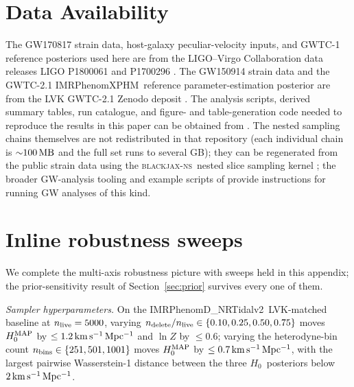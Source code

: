 \documentclass[usenatbib]{mnras}
\newcommand{\kmsmpc}{\ensuremath{\,\rm km\,s^{-1}\,Mpc^{-1}}\xspace}
\newcommand{\hzero}{\ensuremath{H_{0}}\xspace}
\newcommand{\IMR}{IMRPhenomD\_NRTidalv2\xspace}
\newcommand{\XPHM}{IMRPhenomXPHM\xspace}
\newcommand{\bjns}{\textsc{blackjax-ns}\xspace}
\begin{document}
\section*{Data Availability}

The GW170817 strain data, host-galaxy peculiar-velocity inputs, and GWTC-1 reference posteriors used here are from the LIGO--Virgo Collaboration data releases LIGO P1800061 and P1700296 \citep{LVK_GW170817_DataRelease,LVK_H0_DataRelease}. The GW150914 strain data and the GWTC-2.1 \XPHM\ reference parameter-estimation posterior are from the LVK GWTC-2.1 Zenodo deposit \citep{GWTC2p1_GW150914_Zenodo}. The analysis scripts, derived summary tables, run catalogue, and figure- and table-generation code needed to reproduce the results in this paper can be obtained from \citet{Yang2026DataRelease}. The nested sampling chains themselves are not redistributed in that repository (each individual chain is ${\sim}100\,\rm MB$ and the full set runs to several GB); they can be regenerated from the public strain data using the \bjns\ nested slice sampling kernel \citep{Yallup2026BlackjaxNS}; the broader GW-analysis tooling and example scripts of \citet{Prathaban2025GPUSpeed} provide instructions for running GW analyses of this kind.




\appendix

\section{Inline robustness sweeps}
\label{app:robustness}

We complete the multi-axis robustness picture with sweeps held in this appendix; the prior-sensitivity result of Section~\ref{sec:prior} survives every one of them.

\emph{Sampler hyperparameters.} On the \IMR\ LVK-matched baseline at $n_{\rm live}=5000$, varying $n_{\rm delete}/n_{\rm live}\in\{0.10,0.25,0.50,0.75\}$ moves $\hzero^{\rm MAP}$ by $\le 1.2\kmsmpc$ and $\ln Z$ by $\le 0.6$; varying the heterodyne-bin count $n_{\rm bins}\in\{251,501,1001\}$ moves $\hzero^{\rm MAP}$ by $\le 0.7\kmsmpc$, with the largest pairwise Wasserstein-1 distance between the three \hzero\ posteriors below $2\kmsmpc$.
\end{document}
